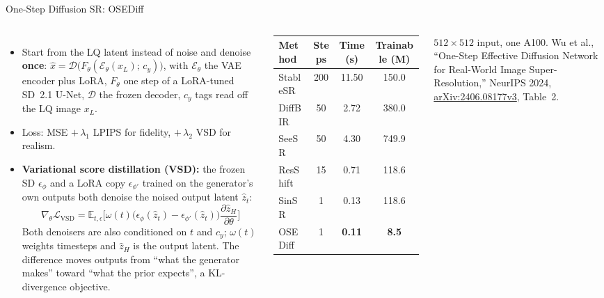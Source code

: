 \begin{frame}{One-Step Diffusion SR: OSEDiff}
  \begin{columns}[T,onlytextwidth]
      \begin{itemize}\footnotesize\itemsep0.3em
        \item Start from the LQ latent instead of noise and denoise \textbf{once}: $\hat{x} = \mathcal{D}\big(F_\theta(\mathcal{E}_\theta(x_L);\, c_y)\big)$, with $\mathcal{E}_\theta$ the VAE encoder plus LoRA, $F_\theta$ one step of a LoRA-tuned SD~2.1 U-Net, $\mathcal{D}$ the frozen decoder, $c_y$ tags read off the LQ image $x_L$.
        \item Loss: MSE $+\,\lambda_1$ LPIPS for fidelity, $+\,\lambda_2$ VSD for realism.
        \item \textbf{Variational score distillation (VSD):} the frozen SD $\epsilon_\phi$ and a LoRA copy $\epsilon_{\phi'}$ trained on the generator's own outputs both denoise the noised output latent $\hat{z}_t$:
        \[ \nabla_\theta \mathcal{L}_{\mathrm{VSD}} = \mathbb{E}_{t,\epsilon}\Big[\omega(t)\big(\epsilon_\phi(\hat{z}_t) - \epsilon_{\phi'}(\hat{z}_t)\big)\frac{\partial \hat{z}_H}{\partial \theta}\Big] \]
        Both denoisers are also conditioned on $t$ and $c_y$; $\omega(t)$ weights timesteps and $\hat{z}_H$ is the output latent. The difference moves outputs from ``what the generator makes'' toward ``what the prior expects'', a KL-divergence objective.
      \end{itemize}
      {\centering\scriptsize\setlength{\tabcolsep}{3pt}
      \begin{tabular}{l c c c}
        \toprule
        \textbf{Method} & \textbf{Steps} & \textbf{Time (s)} & \textbf{Trainable (M)} \\
        \midrule
        StableSR & 200 & 11.50 & 150.0 \\
        DiffBIR & 50 & 2.72 & 380.0 \\
        SeeSR & 50 & 4.30 & 749.9 \\
        ResShift & 15 & 0.71 & 118.6 \\
        SinSR & 1 & 0.13 & 118.6 \\
        OSEDiff & 1 & \textbf{0.11} & \textbf{8.5} \\
        \bottomrule
      \end{tabular}\par}
      \vspace{0.2em}
      {\scriptsize $512 \times 512$ input, one A100. Wu et al., ``One-Step Effective Diffusion Network for Real-World Image Super-Resolution,'' NeurIPS 2024, \href{https://arxiv.org/abs/2406.08177v3}{arXiv:2406.08177v3}, Table~2.\par}

\end{columns}
\end{frame}
